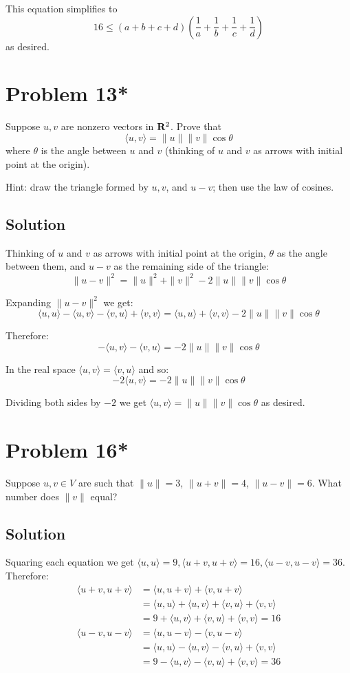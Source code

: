 \documentclass{article}
\begin{document}
This equation simplifies to
\[16\leq(a+b+c+d)\left(\frac{1}{a}+\frac{1}{b}+\frac{1}{c}+\frac{1}{d}\right)\]
as desired.

\section*{Problem 13*}
Suppose $u,v$ are nonzero vectors in $\mathbf{R}^2$. Prove that
\[\langle u,v\rangle=\|u\|\|v\|\cos\theta\]
where $\theta$ is the angle between $u$ and $v$ (thinking of $u$ and $v$ as arrows with initial point at the origin).

\vs

Hint: draw the triangle formed by $u,v$, and $u-v$; then use the law of cosines.

\subsection*{Solution}
Thinking of $u$ and $v$ as arrows with initial point at the origin, $\theta$ as the angle between them, and $u-v$ as the remaining side of the triangle:
\[\|u-v\|^2=\|u\|^2+\|v\|^2-2\|u\|\|v\|\cos\theta\]

Expanding $\|u-v\|^2$ we get:
\[\langle u,u\rangle-\langle u,v\rangle-\langle v,u\rangle+\langle v,v\rangle=\langle u,u\rangle+\langle v,v\rangle-2\|u\|\|v\|\cos\theta\]

Therefore:
\[-\langle u,v\rangle-\langle v,u\rangle=-2\|u\|\|v\|\cos\theta\]

In the real space $\langle u,v\rangle=\langle v,u\rangle$ and so:
\[-2\langle u,v\rangle=-2\|u\|\|v\|\cos\theta\]

Dividing both sides by $-2$ we get $\langle u,v\rangle=\|u\|\|v\|\cos\theta$ as desired.


\section*{Problem 16*}
Suppose $u,v\in V$ are such that $\|u\|=3$, $\|u+v\|=4$, $\|u-v\|=6$. What number does $\|v\|$ equal?

\subsection*{Solution}
Squaring each equation we get $\langle u,u\rangle=9, \langle u+v,u+v\rangle=16, \langle u-v,u-v\rangle=36$. Therefore:
\begin{align*}
    \langle u+v,u+v\rangle&=\langle u,u+v\rangle+\langle v,u+v\rangle\\
    &=\langle u,u\rangle+\langle u,v\rangle+\langle v,u\rangle+\langle v,v\rangle\\
    &=9+\langle u,v\rangle+\langle v,u\rangle+\langle v,v\rangle=16\\
    \langle u-v,u-v\rangle&=\langle u,u-v\rangle-\langle v,u-v\rangle\\
    &=\langle u,u\rangle-\langle u,v\rangle-\langle v,u\rangle+\langle v,v\rangle\\
    &=9-\langle u,v\rangle-\langle v,u\rangle+\langle v,v\rangle=36
\end{align*}
\end{document}
